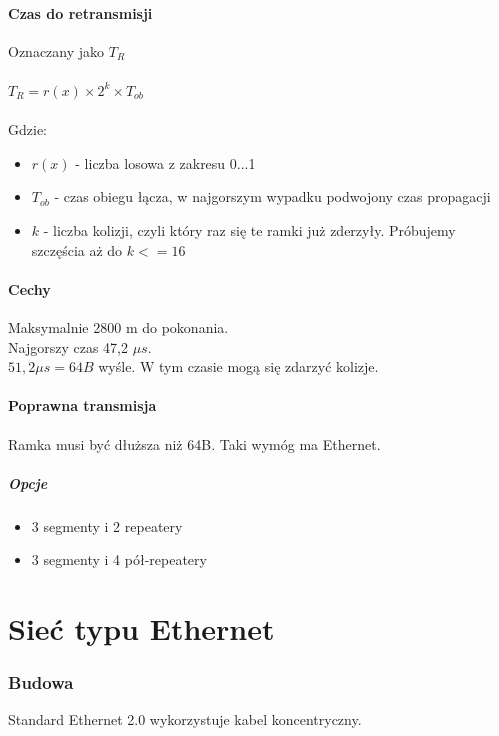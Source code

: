 		\subsection{Czas do retransmisji}
			Oznaczany jako $ T_{R} $\\\\
			$ T_{R} = r(x)\times 2^{k}\times T_{ob}$\\\\Gdzie:\\
			\begin{itemize}
				\item $ r(x) $ - liczba losowa z zakresu 0...1
				\item $ T_{ob} $ - czas obiegu łącza, w najgorszym wypadku podwojony czas propagacji
				\item $ k $ - liczba kolizji, czyli który raz się te ramki już zderzyły. Próbujemy szczęścia aż do $ k <=16 $
			\end{itemize}
		\subsection{Cechy}
			Maksymalnie 2800 m do pokonania.\\
			Najgorszy czas 47,2 $ \mu s $.\\
			$ 51,2 \mu s=64B $ wyśle. W tym czasie mogą się zdarzyć kolizje.
		\subsection{Poprawna transmisja}
			Ramka musi być dłuższa niż 64B. Taki wymóg ma Ethernet.
			\subsubsection{Opcje}
				\begin{itemize}
					\item 3 segmenty i 2 repeatery
					\item 3 segmenty i 4 pół-repeatery
				\end{itemize}


\part{Sieć typu Ethernet}
	\section{Budowa}
		Standard Ethernet 2.0 wykorzystuje kabel koncentryczny.

